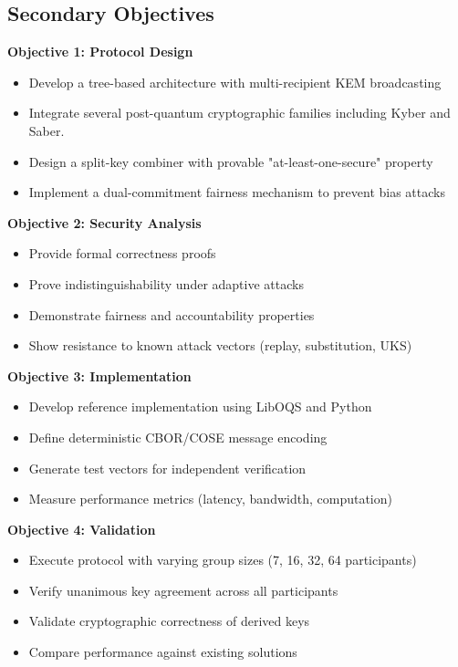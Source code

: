 \documentclass[12pt,a4paper]{report}
\begin{document}
\subsection{Secondary Objectives}

\textbf{Objective 1: Protocol Design}
\begin{itemize}
\item Develop a tree-based architecture with multi-recipient KEM broadcasting
\item Integrate several post-quantum cryptographic families including Kyber and Saber.
\item Design a split-key combiner with provable "at-least-one-secure" property
\item Implement a dual-commitment fairness mechanism to prevent bias attacks
\end{itemize}

\textbf{Objective 2: Security Analysis}
\begin{itemize}
\item Provide formal correctness proofs
\item Prove indistinguishability under adaptive attacks
\item Demonstrate fairness and accountability properties
\item Show resistance to known attack vectors (replay, substitution, UKS)
\end{itemize}

\textbf{Objective 3: Implementation}
\begin{itemize}
\item Develop reference implementation using LibOQS and Python
\item Define deterministic CBOR/COSE message encoding
\item Generate test vectors for independent verification
\item Measure performance metrics (latency, bandwidth, computation)
\end{itemize}

\textbf{Objective 4: Validation}
\begin{itemize}
\item Execute protocol with varying group sizes (7, 16, 32, 64 participants)
\item Verify unanimous key agreement across all participants
\item Validate cryptographic correctness of derived keys
\item Compare performance against existing solutions
\end{itemize}
\end{document}
